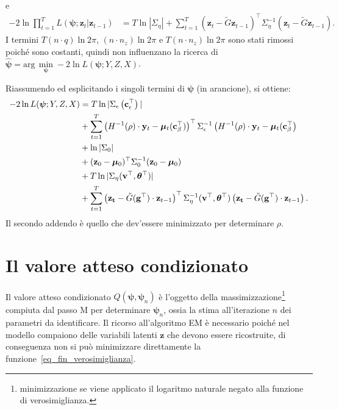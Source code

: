 e
\begin{equation}
	\begin{split}
		- 2\ln\prod_{t=1}^{T} L(\boldsymbol{\psi}; \mathbf{z}_t|\mathbf{z}_{t-1}) & = T\ln|\Sigma_\eta| +\sum_{t=1}^{T} \left(\mathbf{z}_t - \tilde{G}\mathbf{z}_{t-1} \right)^\top\Sigma_\eta^{-1}\left(\mathbf{z}_t - \tilde{G}\mathbf{z}_{t-1} \right).
	\end{split}
\end{equation}
I termini $T(n\cdot q)\ln 2\pi$, $(n\cdot n_z)\ln 2\pi$ e $T(n\cdot n_z)\ln 2\pi$ sono stati rimossi poiché sono costanti, quindi non influenzano la ricerca di $\hat{\boldsymbol{\psi}}=\text{arg}\,\min\limits_{\boldsymbol{\psi}} -2\ln L(\boldsymbol{\psi}; Y, Z, X)$. \par Riassumendo ed esplicitando i singoli termini di $\boldsymbol{\psi}$ (in arancione), si ottiene:
\begin{equation}
	\begin{split}
		-2\ln L(\boldsymbol{\psi}; Y, Z, X) & =  T\ln|\Sigma_\epsilon\left(\textcolor{black}{\mathbf{c}_\epsilon^\top}\right)| \\
		& + \sum_{t=1}^{T} \left(H^{-1}(\textcolor{black}{\rho})\cdot\mathbf{y}_t - \boldsymbol{\mu}_t(\textcolor{black}{\mathbf{c}_\beta^\top})\right)^\top\Sigma_\epsilon^{-1}\left(H^{-1}(\textcolor{black}{\rho})\cdot\mathbf{y}_t - \boldsymbol{\mu}_t(\textcolor{black}{\mathbf{c}_\beta^\top}\right) \\
		& + \ln|\Sigma_0| \\
		& + (\mathbf{z}_0 - \boldsymbol{\mu}_0)^\top\Sigma_0^{-1}(\mathbf{z}_0 - \boldsymbol{\mu}_0) \\
		& + T\ln |\Sigma_\eta(\textcolor{black}{\mathbf{v}^\top,\boldsymbol{\theta}^\top})| \\
		& + \sum_{t=1}^{T}\left(\mathbf{z_t}-\tilde{G}(\textcolor{black}{\mathbf{g}^\top})\cdot\mathbf{z}_{t-1}\right)^\top\Sigma_\eta^{-1}(\textcolor{black}{\mathbf{v}^\top,\boldsymbol{\theta}^\top})\left(\mathbf{z_t}-\tilde{G}(\textcolor{black}{\mathbf{g}^\top})\cdot\mathbf{z}_{t-1}\right).
	\end{split}
	\label{eq_fin_verosimiglianza}
\end{equation}
Il secondo addendo è quello che dev'essere minimizzato per determinare $\rho$.

\section[Il valore atteso condizionato]{Il valore atteso condizionato}
Il valore atteso condizionato $Q(\boldsymbol{\psi}, \boldsymbol{\psi}_n)$ è l'oggetto della massimizzazione\footnote{minimizzazione se viene applicato il logaritmo naturale negato alla funzione di verosimiglianza.} compiuta dal passo M per determinare $\boldsymbol{\psi}_n$, ossia la stima all'iterazione $n$ dei parametri da identificare. Il ricorso all'algoritmo EM è necessario poiché nel modello compaiono delle variabili latenti $\mathbf{z}$ che devono essere ricostruite, di conseguenza non si può minimizzare direttamente la funzione~\ref{eq_fin_verosimiglianza}.

